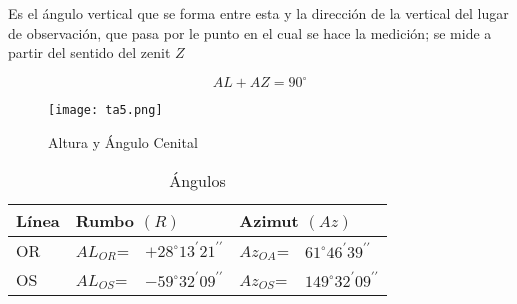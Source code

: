 \begin{definition}
    Es el ángulo vertical que se forma entre esta y la dirección de la vertical del lugar de observación, que pasa por le punto en el cual se hace la medición; se mide a partir del sentido del zenit $Z$
\end{definition}

\begin{equation}
    AL+AZ=90^{\circ}
\end{equation}

\begin{figure}[h!]
  \centerline{\texttt{[image: ta5.png]}}
  \caption{Altura y Ángulo Cenital}
  \label{ta5}
\end{figure}

\begin{table}[h!]
    \centering
    \begin{tabular}{lllll}
        \hline
        Línea & \multicolumn{2}{l}{Rumbo $(R)$}                        & \multicolumn{2}{l}{Azimut $(Az)$}                      \\ \hline
        OR    & $AL_{OR}$= & $+28^{\circ}13^{\prime}21^{\prime\prime}$ & $Az_{OA}$= & $61^{\circ}46^{\prime}39^{\prime\prime}$  \\
        OS    & $AL_{OS}$= & $-59^{\circ}32^{\prime}09^{\prime\prime}$ & $Az_{OS}$= & $149^{\circ}32^{\prime}09^{\prime\prime}$
    \end{tabular}
    \caption{Ángulos}
    \label{tabta2}
\end{table}

